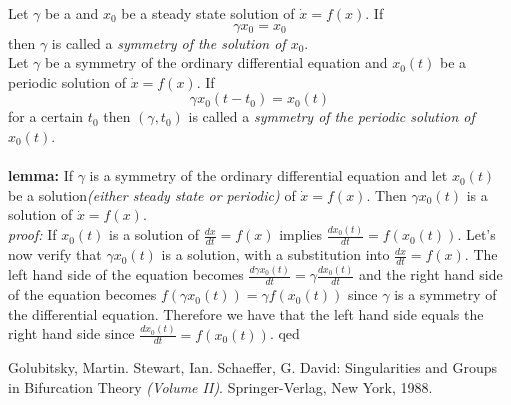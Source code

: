 \documentclass[12pt]{article}
\begin{document}

Let $\gamma$ be a  and $x_0$ be a steady state solution of $\dot{x} = f(x)$.  If $$\gamma x_0 = x_0$$ then $\gamma$ is called a \emph{symmetry of the solution of $x_0$}.\\

Let $\gamma$ be a symmetry of the ordinary differential equation and $x_0(t)$ be a periodic solution of $\dot{x} = f(x)$.  If $$\gamma x_0(t-t_0) = x_0(t)$$ for a certain $t_0$ then $(\gamma, t_0)$ is called a \emph{symmetry of the periodic solution of $x_0(t)$}.\\\\
\textbf{lemma:} If $\gamma$ is a symmetry of the ordinary differential equation and let $x_0(t)$ be a solution\textit{(either steady state or periodic)} of $\dot{x} = f(x)$.  Then $\gamma x_0(t)$ is a solution of $\dot{x} = f(x)$.\\
\textit{proof:}  If $x_0(t)$ is a solution of $\frac{d x}{dt} = f(x)$ implies $\frac{d x_0(t)}{dt} = f(x_0(t))$.  Let's now verify that $\gamma x_0(t)$ is a solution, with a substitution into $\frac{d x}{dt} = f(x)$.  The left hand side of the equation becomes $\frac{d\gamma x_0(t)}{dt} = \gamma \frac{dx_0(t)}{dt}$ and the right hand side of the equation becomes $f(\gamma x_0(t))= \gamma f(x_0(t))$ since $\gamma$ is a symmetry of the differential equation.  Therefore we have that the left hand side equals the right hand side since $\frac{dx_0(t)}{dt} = f(x_0(t))$.
qed
\begin{thebibliography}{1}
 Golubitsky, Martin. Stewart, Ian. Schaeffer, G. David: Singularities and Groups in Bifurcation Theory \textit{(Volume II)}. Springer-Verlag, New York, 1988.
\end{thebibliography}
\end{document}
